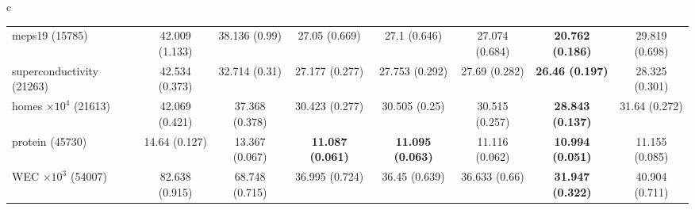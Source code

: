 \documentclass[border=6pt]{standalone}
\begin{document}
\begin{adjustbox}{max width=\linewidth}
\begin{tabular}{c}
\begin{tabular}{lccccccc}
meps19 (15785) & 42.009 (1.133) & 38.136 (0.99) & 27.05 (0.669) & 27.1 (0.646) & 27.074 (0.684) & \textbf{20.762 (0.186)} & 29.819 (0.698)\\
superconductivity (21263) & 42.534 (0.373) & 32.714 (0.31) & 27.177 (0.277) & 27.753 (0.292) & 27.69 (0.282) & \textbf{26.46 (0.197)} & 28.325 (0.301)\\
homes $\times 10^4$ (21613) & 42.069 (0.421) & 37.368 (0.378) & 30.423 (0.277) & 30.505 (0.25) & 30.515 (0.257) & \textbf{28.843 (0.137)} & 31.64 (0.272)\\
protein (45730) & 14.64 (0.127) & 13.367 (0.067) & \textbf{11.087 (0.061)} & \textbf{11.095 (0.063)} & 11.116 (0.062) & \textbf{10.994 (0.051)} & 11.155 (0.085)\\
WEC $\times 10^3$ (54007) & 82.638 (0.915) & 68.748 (0.715) & 36.995 (0.724) & 36.45 (0.639) & 36.633 (0.66) & \textbf{31.947 (0.322)} & 40.904 (0.711)\\
\hline
\end{tabular}
\end{tabular}
\end{adjustbox}
\end{document}
